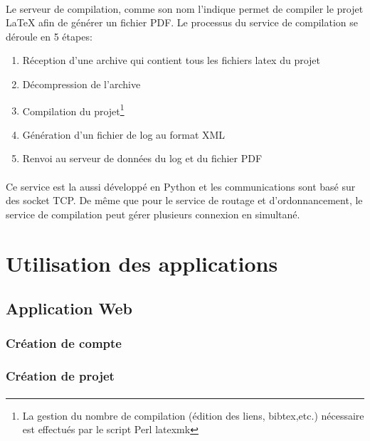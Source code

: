 \documentclass[a4paper,12pt]{article}
\begin{document}
\paragraph*{}
Le serveur de compilation, comme son nom l'indique permet de compiler le projet LaTeX afin de générer un fichier PDF. Le processus du service de compilation se déroule en 5 étapes:
\begin{enumerate}
 \item Réception d'une archive qui contient tous les fichiers latex du projet
 \item Décompression de l'archive
 \item Compilation du projet\footnote{La gestion du nombre de compilation (édition des liens, bibtex,etc.) nécessaire est effectués par le script Perl latexmk}
 \item Génération d'un fichier de log au format XML
 \item Renvoi au serveur de données du log et du fichier PDF
\end{enumerate}

\paragraph{}
Ce service est la aussi développé en Python et les communications sont basé sur des socket TCP. De même que pour le service de routage et d'ordonnancement, le service de compilation peut gérer plusieurs connexion en simultané.


\newpage
\section{Utilisation des applications}
\subsection{Application Web}
\subsubsection{Création de compte}
\paragraph*{}

\subsubsection{Création de projet}
\paragraph*{}
\end{document}
